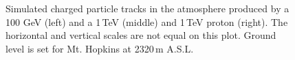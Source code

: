 \begin{figure}[t]
{{}}
\caption{\label{FIG::TECHNIQUE::SHOWERS} Simulated charged particle tracks 
in the atmosphere produced by a 100 GeV \Gray (left) and a 1\,TeV
\Gray (middle) and 1\,TeV proton (right). The horizontal and vertical
scales are not equal on this plot. Ground level is set for Mt. Hopkins
at 2320\,m A.S.L.}
\end{figure}

